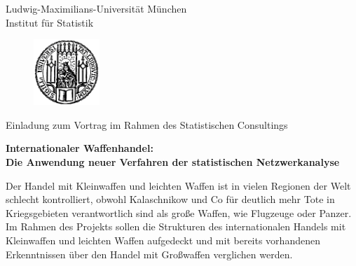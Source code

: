 \documentclass{article}
\begin{document}
\pagestyle{empty}

\begin{center}
\large{Ludwig-Maximilians-Universit\"at M\"unchen \\
Institut f\"ur Statistik}\\
\end{center}

\begin{figure}[h!]
\begin{minipage}{1.0\linewidth}\centering
\includegraphics[width=2.5cm]{siegel.jpg}
\end{minipage}
\end{figure}

\begin{center}
\large{Einladung zum Vortrag im Rahmen des Statistischen Consultings}\\
\end{center}
\bigskip

\begin{center}
\Large{\textbf{Internationaler Waffenhandel:\\ Die Anwendung neuer Verfahren der statistischen Netzwerkanalyse}}\\
\end{center}
\vspace{1cm}

\noindent
Der Handel mit Kleinwaffen und leichten Waffen ist in vielen Regionen der Welt schlecht kontrolliert, obwohl Kalaschnikow und Co für deutlich mehr Tote in Kriegsgebieten verantwortlich sind als große Waffen, wie Flugzeuge oder Panzer. Im Rahmen des Projekts sollen die Strukturen des internationalen Handels mit Kleinwaffen und leichten Waffen aufgedeckt und mit bereits vorhandenen Erkenntnissen über den Handel mit Großwaffen verglichen werden.\\
\end{document}

